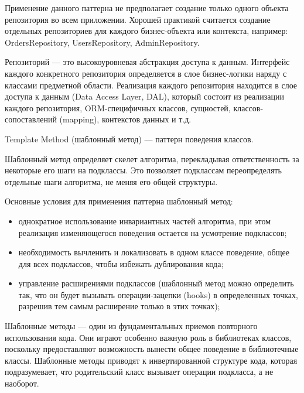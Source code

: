 Применение данного паттерна не предполагает создание только одного объекта репозитория во всем приложении. Хорошей практикой считается создание отдельных репозиториев для каждого бизнес-объекта или контекста, например: OrdersRepository, UsersRepository, AdminRepository.

Репозиторий --- это высокоуровневая абстракция доступа к данным. Интерфейс каждого конкретного репозитория определяется в слое бизнес-логики наряду с классами предметной области. Реализация каждого репозитория находится в слое доступа к данным (Data Access Layer, DAL), который состоит из реализации каждого репозитория, ORM-специфичных классов, сущностей, классов-сопоставлений (mapping), контекстов данных и т.д.



Template Method (шаблонный метод) \cite{patterns} --- паттерн поведения классов.

Шаблонный метод определяет скелет алгоритма, перекладывая ответственность за некоторые его шаги на подклассы. Это позволяет подклассам переопределять отдельные шаги алгоритма, не меняя его общей структуры.

Основные условия для применения паттерна шаблонный метод:

\begin{itemize}[label*=---]
	\item однократное использование инвариантных частей алгоритма, при этом реализация изменяющегося поведения остается на усмотрение подклассов;
	\item необходимость вычленить и локализовать в одном классе поведение, общее для всех подклассов, чтобы избежать дублирования кода;
	\item управление расширениями подклассов (шаблонный метод можно определить так, что он будет вызывать операции-зацепки (hooks) в определенных точках, разрешив тем самым расширение только в этих точках);
\end{itemize}

Шаблонные методы --- один из фундаментальных приемов повторного использования кода. Они играют особенно важную роль в библиотеках классов, поскольку предоставляют возможность вынести общее поведение в библиотечные классы. Шаблонные методы приводят к инвертированной структуре кода, которая подразумевает, что родительский класс вызывает операции подкласса, а не наоборот.

\pagebreak